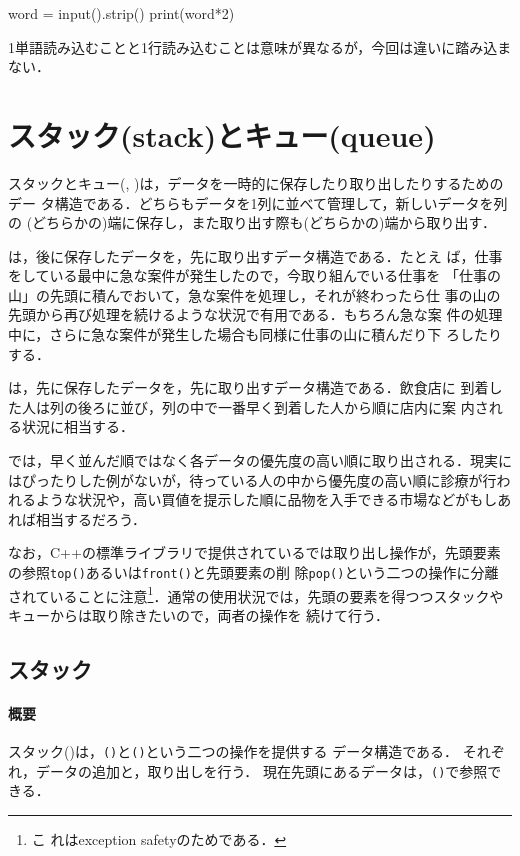 \begin{pybox}
word = input().strip()
print(word*2)
\end{pybox}

1単語読み込むことと1行読み込むことは意味が異なるが，今回は違いに踏み込まない．


\section{スタック(stack)とキュー(queue)}

スタックとキュー(\pcaojbook[pp.~80--], \pccbook[pp.~31--])は，データを一時的に保存したり取り出したりするためのデー
タ構造である．どちらもデータを1列に並べて管理して，新しいデータを列の
(どちらかの)端に保存し，また取り出す際も(どちらかの)端から取り出す．

は，後に保存したデータを，先に取り出すデータ構造である．たとえ
ば，仕事をしている最中に急な案件が発生したので，今取り組んでいる仕事を
「仕事の山」の先頭に積んでおいて，急な案件を処理し，それが終わったら仕
事の山の先頭から再び処理を続けるような状況で有用である．もちろん急な案
件の処理中に，さらに急な案件が発生した場合も同様に仕事の山に積んだり下
ろしたりする．

は，先に保存したデータを，先に取り出すデータ構造である．飲食店に
到着した人は列の後ろに並び，列の中で一番早く到着した人から順に店内に案
内される状況に相当する．


では，早く並んだ順ではなく各データの優先度の高い順に取り出される．現実にはぴったりした例がないが，待っている人の中から優先度の高い順に診療が行われるような状況や，高い買値を提示した順に品物を入手できる市場などがもしあれば相当するだろう．


なお，C++の標準ライブラリで提供されているでは取り出し操作が，先頭要素の参照\texttt{top()}あるいは\texttt{front()}と先頭要素の削
除\texttt{pop()}という二つの操作に分離されていることに注意\footnote{こ
  れはexception safetyのためである．}．通常の使用状況では，先頭の要素を得つつスタックやキューからは取り除きたいので，両者の操作を
続けて行う．


\subsection{スタック}\label{section:stack}

\paragraph{概要}
スタック()は，\texttt{()}と\texttt{()}という二つの操作を提供する
データ構造である．
それぞれ，データの追加と，取り出しを行う．
現在先頭にあるデータは，\texttt{()}で参照できる．

